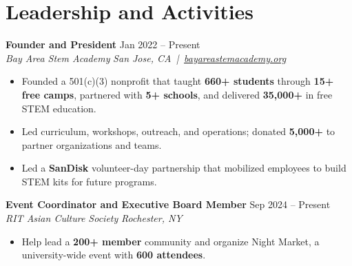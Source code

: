 \documentclass[10pt,letterpaper]{article}
\newif\ifresumeFirstRole
\newcommand{\resumeRole}[4]{%
  \ifresumeFirstRole
    \global\resumeFirstRolefalse
  \else
    \vspace{2pt}%
  \fi
  \textbf{#1} \hfill #2\\
  \textit{#3} \hfill \textit{#4}
}
\begin{document}
\section*{Leadership and Activities}
\resumeRole{Founder and President}{Jan 2022 -- Present}{Bay Area Stem Academy}{San Jose, CA \,|\, \href{https://bayareastemacademy.org}{bayareastemacademy.org}}
\begin{itemize}
  \item Founded a 501(c)(3) nonprofit that taught \textbf{660+ students} through \textbf{15+ free camps}, partnered with \textbf{5+ schools}, and delivered \textbf{\textdollar{}35,000+} in free STEM education.
  \item Led curriculum, workshops, outreach, and operations; donated \textbf{\textdollar{}5,000+} to partner organizations and teams.
  \item Led a \textbf{SanDisk} volunteer-day partnership that mobilized employees to build STEM kits for future programs.
\end{itemize}

\resumeRole{Event Coordinator and Executive Board Member}{Sep 2024 -- Present}{RIT Asian Culture Society}{Rochester, NY}
\begin{itemize}
  \item Help lead a \textbf{200+ member} community and organize Night Market, a university-wide event with \textbf{600 attendees}.
\end{itemize}
\end{document}
